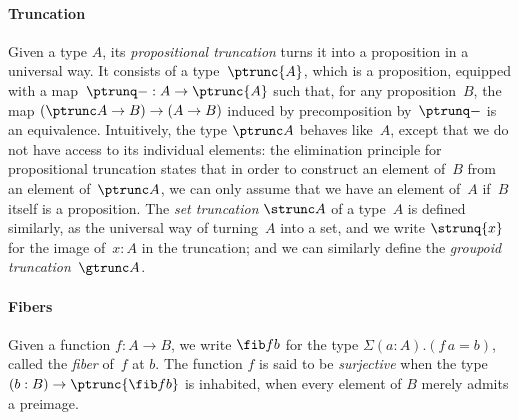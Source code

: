 \paragraph{Truncation}
Given a type $A$, its \emph{propositional truncation} turns it into a
proposition in a universal way. It consists of a type~$\ptrunc{A}$, which is a
proposition, equipped with a map~$\ptrunq-:A\to\ptrunc{A}$ such that, for any
proposition~$B$, the map $(\ptrunc A\to B)\to(A\to B)$ induced by precomposition
by~$\ptrunq-$ is an equivalence. Intuitively, the type $\ptrunc A$ behaves like~$A$,
except that we do not have access to its individual elements: the elimination
principle for propositional truncation states that in order to construct an
element of~$B$ from an element of~$\ptrunc A$, we can only assume that we have
an element of~$A$ if~$B$ itself is a proposition.
%
The \emph{set truncation} $\strunc A$ of a type~$A$ is defined similarly, as the
universal way of turning~$A$ into a set, and we write $\strunq{x}$ for the image
of~$x:A$ in the truncation; and we can similarly define the \emph{groupoid truncation}~$\gtrunc A$.

\paragraph{Fibers}
Given a function $f:A\to B$, we write $\fib fb$ for the type $\Sigma(a:A).(f\,a=b)$, called the \emph{fiber} of~$f$ at $b$. The function $f$ is said to be \emph{surjective} when the type $(b:B)\to\ptrunc{\fib fb}$ is inhabited, \ie when every element of $B$ merely admits a preimage.


